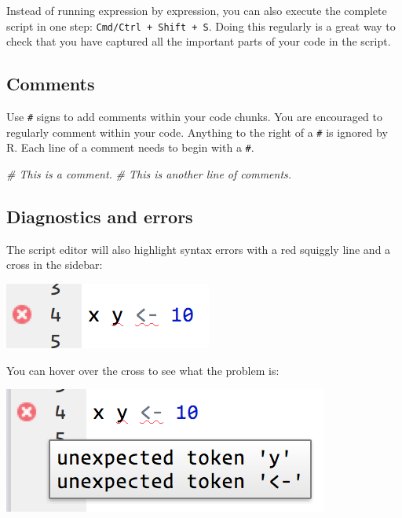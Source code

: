 \documentclass[]{book}
\newenvironment{Shaded}{\begin{snugshade}}{\end{snugshade}}
\newcommand{\CommentTok}[1]{\textcolor[rgb]{0.56,0.35,0.01}{\textit{#1}}}
\begin{document}
Instead of running expression by expression, you can also execute the
complete script in one step: \texttt{Cmd/Ctrl\ +\ Shift\ +\ S}. Doing
this regularly is a great way to check that you have captured all the
important parts of your code in the script.

\subsection{Comments}\label{comments}

Use \texttt{\#} signs to add comments within your code chunks. You are
encouraged to regularly comment within your code. Anything to the right
of a \texttt{\#} is ignored by R. Each line of a comment needs to begin
with a \texttt{\#}.

\begin{Shaded}
\begin{Highlighting}[]
\CommentTok{# This is a comment.}
\CommentTok{# This is another line of comments.}
\end{Highlighting}
\end{Shaded}

\subsection{Diagnostics and errors}\label{diagnostics-and-errors}

The script editor will also highlight syntax errors with a red squiggly
line and a cross in the sidebar:

\begin{center}\includegraphics[width=0.7\linewidth]{img/rstudio-diagnostic} \end{center}

You can hover over the cross to see what the problem is:

\begin{center}\includegraphics[width=0.7\linewidth]{img/rstudio-diagnostic-tip} \end{center}
\end{document}
